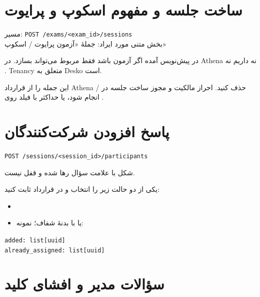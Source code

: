 \documentclass[a4paper,11pt]{article}
\newcommand{\apipath}[1]{\texttt{#1}}
\newcommand{\codeline}[1]{\apipath{#1}\\}
\begin{document}
\section{ساخت جلسه و مفهوم اسکوپ و پرایوت}

\begin{apibox}
\noindent مسیر: \apipath{POST /exams/<exam\_id>/sessions}\\
بخش متنی مورد ایراد: جملهٔ «آزمون پرایوت / اسکوپ»
\end{apibox}

\begin{problembox}
در پیش‌نویس آمده اگر آزمون  باشد فقط  مربوط می‌تواند  بسازد.
در Athena نه  داریم نه . Tenancy متعلق به Desko است.
\end{problembox}

\begin{solutionbox}
این جمله را از قرارداد Athena حذف کنید.
احراز مالکیت و مجوز ساخت جلسه در / انجام شود،
یا حداکثر با فیلد  روی .
\end{solutionbox}

\section{پاسخ افزودن شرکت‌کنندگان}

\begin{apibox}
\apipath{POST /sessions/<session\_id>/participants}
\end{apibox}

\begin{problembox}
شکل  با علامت سؤال رها شده و قفل نیست.
\end{problembox}

\begin{solutionbox}
یکی از دو حالت زیر را انتخاب و در قرارداد ثابت کنید:
\begin{itemize}
  \item {}
  \item یا  با بدنهٔ شفاف؛ نمونه:
\end{itemize}
\end{solutionbox}

\begin{codebox}
\codeline{added: list[uuid]}
\apipath{already\_assigned: list[uuid]}
\end{codebox}

\section{سؤالات مدیر و افشای کلید}
\end{document}
